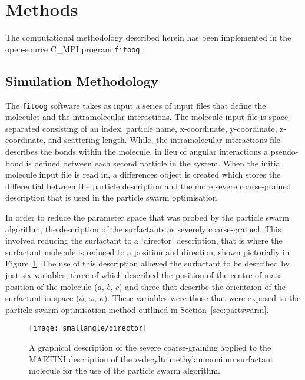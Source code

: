 \section{Methods}

The computational methodology described herein has been implemented in the open-source C\_MPI program \texttt{fitoog} \cite{mccluskey_arm61/fitoog_2019}.

\subsection{Simulation Methodology}

The \texttt{fitoog} software takes as input a series of input files that define the molecules and the intramolecular interactions. 
The molecule input file is space separated consisting of an index, particle name, x-coordinate, y-coordinate, z-coordinate, and scattering length. 
While, the intramolecular interactions file describes the bonds within the molecule, in lieu of angular interactions a pseudo-bond is defined between each second particle in the system. 
When the initial molecule input file is read in, a differences object is created which stores the differential between the particle description and the more severe coarse-grained description that is used in the particle swarm optimisation. 

In order to reduce the parameter space that was probed by the particle swarm algorithm, the description of the surfactants as severely coarse-grained.
This involved reducing the surfactant to a `director' description, that is where the surfactant molecule is reduced to a position and direction, shown pictorially in Figure~\ref{fig:director}.
The use of this description allowed the surfactant to be desrcibed by just six variables; three of which described the position of the centre-of-mass position of the molecule ($a$, $b$, $c$) and three that describe the orientaion of the surfactant in space ($\phi$, $\omega$, $\kappa$).
These variables were those that were exposed to the particle swarm optimisation method outlined in Section~\ref{sec:partswarm}.
%
\begin{figure}
    \centering
    \texttt{[image: smallangle/director]}
    \caption{A graphical description of the severe coarse-graining applied to the MARTINI description of the \emph{n}-decyltrimethylammonium surfactant molecule for the use of the particle swarm algorithm.}
    \label{fig:director}
\end{figure}
%

